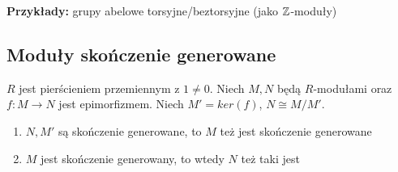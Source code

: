 \textbf{Przykłady:} grupy abelowe torsyjne/beztorsyjne (jako $\mathbb{Z}$-moduły)

\subsection{Moduły skończenie generowane}

\begin{theorem}\label{twierdzenie:11.14}
  $R$ jest pierścieniem przemiennym z $1\neq 0$. Niech $M,N$ będą $R$-modułami oraz $f:M\to N$ jest epimorfizmem. Niech $M'=ker(f)$, $N\cong M/M'$.

  \begin{enumerate}
    \item $N,M'$ są skończenie generowane, to $M$ też jest skończenie generowane
    \item $M$ jest skończenie generowany, to wtedy $N$ też taki jest
  \end{enumerate}
\end{theorem}
